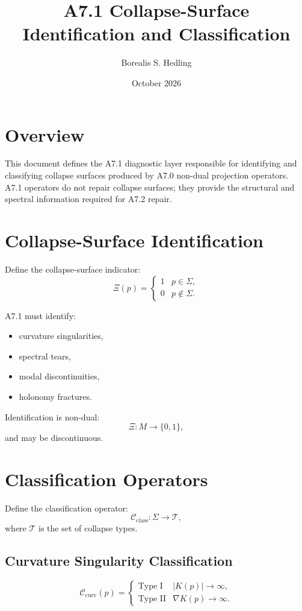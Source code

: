 \documentclass[11pt]{article}
\title{A7.1 Collapse-Surface Identification and Classification}
\author{Borealis S. Hedling}
\date{October 2026}
\begin{document}
\maketitle

\section*{Overview}

This document defines the A7.1 diagnostic layer responsible for identifying
and classifying collapse surfaces produced by A7.0 non-dual projection
operators. A7.1 operators do not repair collapse surfaces; they provide the
structural and spectral information required for A7.2 repair.

\section{Collapse-Surface Identification}

Define the collapse-surface indicator:
\[
\Xi(p) =
\begin{cases}
1 & p \in \Sigma,\\
0 & p \notin \Sigma.
\end{cases}
\]

A7.1 must identify:
\begin{itemize}
  \item curvature singularities,
  \item spectral tears,
  \item modal discontinuities,
  \item holonomy fractures.
\end{itemize}

Identification is non-dual:
\[
\Xi : M \to \{0,1\},
\]
and may be discontinuous.

\section{Classification Operators}

Define the classification operator:
\[
\mathcal{C}_{\mathrm{class}} : \Sigma \to \mathcal{T},
\]
where $\mathcal{T}$ is the set of collapse types.

\subsection{Curvature Singularity Classification}
\[
\mathcal{C}_{\mathrm{curv}}(p) =
\begin{cases}
\text{Type I} & |K(p)| \to \infty,\\
\text{Type II} & \nabla K(p) \to \infty.
\end{cases}
\]
\end{document}
